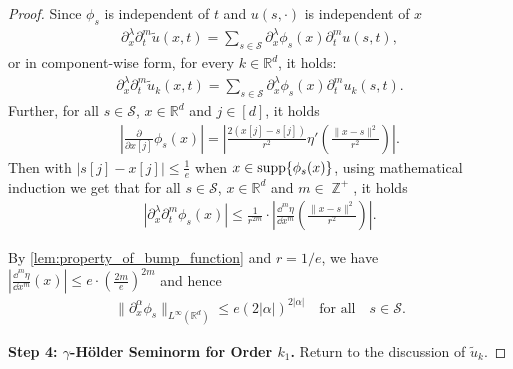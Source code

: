 \documentclass[12pt]{article}
\numberwithin{equation}{section}
\let\tilde\widetilde
\newcommand{\calS}{\mathcal{S}}
\newcommand{\wt}{\widetilde}
\renewcommand{\tilde}{\wt}
\DeclareMathOperator*{\Z}{\mathbb{Z}}
\def\R{\mathbb{R}}
\theoremstyle{theoremstyle}
\numberwithin{equation}{section}
\numberwithin{theorem}{section}
\numberwithin{proposition}{section}
\numberwithin{definition}{section}
\numberwithin{lemma}{section}
\numberwithin{assumption}{section}
\numberwithin{remark}{section}
\begin{document}
\begin{proof}
Since $\phi_s$ is independent of $t$ and $u(s,\cdot)$ is independent of $x$
\begin{align*}
    \partial_x^\lambda\partial_t^m \tilde u(x,t)
    = \sum_{s\in\calS} \partial_x^\lambda \phi_s (x) \partial_t^m u(s,t),
\end{align*}
or in component-wise form, for every $k\in\R^d$, it holds:
\begin{align*}
\partial_x^\lambda\partial_t^m \tilde{u}_k(x,t)=\sum_{s\in \mathcal{S}}\partial^\lambda_x\phi_s(x)\partial^{m}_t u_k(s,t).
\end{align*}
Further,  for all $s\in \mathcal{S}$, $x\in\R^d$ and $j\in [d]$, it holds
\begin{align*}
|\frac{\partial}{\partial x[j]}\phi_s(x)| = 
|\frac{2(x[j]-s[j])}{r^2}\eta'(\frac{\|x-s\|^2}{r^2})|.
\end{align*}
Then with $|s[j]-x[j]|\leq\frac{1}{e}$ when $x\in{\rm supp}\{\phi_s(x)\}$, using mathematical induction we get that for all $s\in \mathcal{S}$, $x\in\R^d$ and $m\in\Z^+$, it holds 
\begin{align*}
    |\partial_x^\lambda\partial_t^m\phi_s(x)| \leq \frac{1}{r^{2m}} \cdot |\frac{\dd^m\eta}{\dd x^m}(\frac{\|x-s\|^2}{r^2})|.
\end{align*}

By \cref{lem:property_of_bump_function} and $r=1/e$, we have $|\frac{\dd^m\eta}{\dd x^m}(x)|\leq e\cdot(\frac{2m}{e})^{2m}$ and hence
\begin{align}
    \label{eq:bound_of_phi_derivative}
    \|\partial_x^\alpha \phi_s\|_{L^\infty(\R^d)}
    \le e(2|\alpha|)^{2|\alpha|}
    \quad
    \text{for all}\quad s\in\calS.
\end{align}





\textbf{Step 4: $\gamma$-H\"older Seminorm for Order $k_1$.}
Return to the discussion of $\tilde{u}_k$. 


\end{proof}
\end{document}
